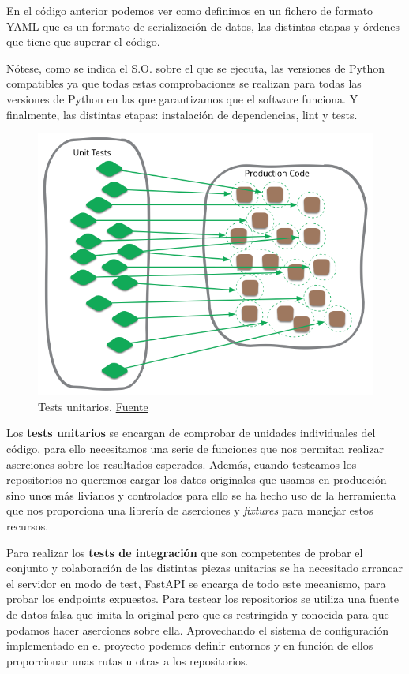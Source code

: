 En el código anterior podemos ver como definimos en un fichero de formato YAML que es un
formato de serialización de datos, las distintas etapas y órdenes que tiene que superar el
código.

Nótese, como se indica el S.O. sobre el que se ejecuta, las versiones de Python
compatibles ya que todas estas comprobaciones se realizan para todas las versiones de
Python en las que garantizamos que el software funciona. Y finalmente, las distintas
etapas: instalación de dependencias, lint y tests.

\FloatBarrier
\begin{figure}[h]
	\centering	
	\includegraphics[width=\textwidth]{doc/logos/imgs/unit-test.png}
    \caption{ Tests unitarios.
    \href{https://martinfowler.com/bliki/images/unitTest/sketch.png}{Fuente}}
    \label{fig:unit-tests}
\end{figure}
\FloatBarrier

Los \textbf{tests unitarios} se encargan de comprobar de unidades individuales del código,
para ello necesitamos una serie de funciones que nos permitan realizar aserciones sobre
los resultados esperados. Además, cuando testeamos los repositorios no queremos cargar los
datos originales que usamos en producción sino unos más livianos y controlados para ello
se ha hecho uso de la herramienta  que nos proporciona una librería de
aserciones y \textit{fixtures} para manejar estos recursos.

Para realizar los \textbf{tests de integración} que son competentes de probar el conjunto
y colaboración de las distintas piezas unitarias se ha necesitado arrancar el servidor en
modo de test, FastAPI se encarga de todo este mecanismo, para probar los endpoints
expuestos. Para testear los repositorios se utiliza una fuente de datos falsa que imita la
original pero que es restringida y conocida para que podamos hacer aserciones sobre ella.
Aprovechando el sistema de configuración implementado en el proyecto podemos definir
entornos y en función de ellos proporcionar unas rutas u otras a los repositorios.

